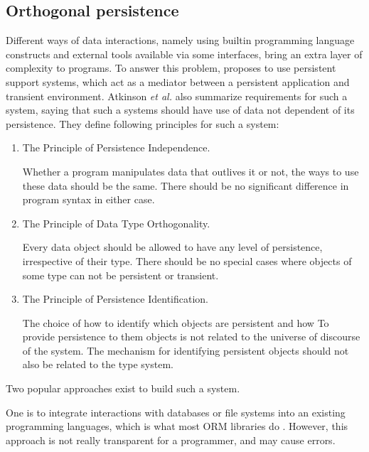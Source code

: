 \subsection{Orthogonal persistence}

Different ways of data interactions, namely using builtin programming language 
constructs and external tools available via some interfaces, bring an extra
layer of complexity to programs. To answer this problem, 
\cite{atkinson1995orthogonally} proposes to use persistent support systems, 
which act as a mediator between a persistent application and transient 
environment. Atkinson \textit{et al.} also summarize requirements for such a
system, saying that such a systems should have use of data not dependent of its
persistence. They define following principles for such a system:
\begin{enumerate}
    \item The Principle of Persistence Independence. 
    
    Whether a program manipulates data that outlives it or not, the ways to use
    these data should be the same. There should be no significant difference in
    program syntax in either case.

    \item The Principle of Data Type Orthogonality. 
    
    Every data object should be allowed to have any level of persistence, 
    irrespective of their type. There should be no special cases where objects
    of some type can not be persistent or transient.
    
    \item  The Principle of Persistence Identification. 
    
    The choice of how to identify which objects are persistent and how To
    provide persistence to them objects is not related to the universe of 
    discourse of the system. The mechanism for identifying persistent objects 
    should not also be related to the type system.

\end{enumerate}

Two popular approaches exist to build such a system. 

One is to integrate interactions with databases or file systems into an existing 
programming languages, which is what most ORM libraries do 
\cite{аннин2018краткий,copeland2008essential}. However, this approach is not 
really transparent for a programmer, and may cause errors. 

